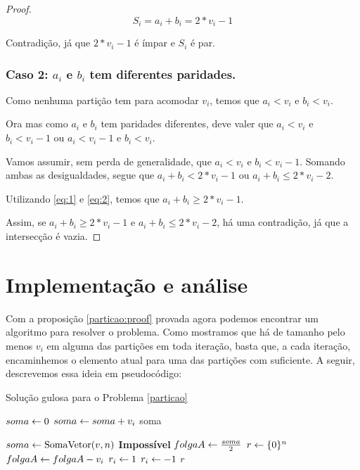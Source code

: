 \begin{proof}
$$S_i = a_i + b_i = 2*v_i - 1$$

Contradição, já que $2*v_i - 1$ é ímpar e $S_i$ é par.

\subsubsection*{Caso 2: $a_i$ e $b_i$ tem diferentes paridades.}

Como nenhuma partição tem  para acomodar $v_i$, temos que $a_i < v_i$ e $b_i < v_i$.

Ora mas como $a_i$ e $b_i$ tem paridades diferentes, deve valer que $a_i < v_i$ e $b_i < v_i - 1$ ou $a_i < v_i - 1$ e $b_i < v_i$.

Vamos assumir, sem perda de generalidade, que $a_i < v_i$ e $b_i < v_i - 1$. Somando ambas as desigualdades, segue que $a_i + b_i < 2*v_i - 1$ ou $a_i + b_i \leq 2*v_i - 2$.

Utilizando \ref{eq:1} e \ref{eq:2}, temos que $a_i + b_i \geq 2*v_i - 1$.

Assim, se $a_i + b_i \geq 2*v_i - 1$ e $a_i + b_i \leq 2*v_i - 2$, há uma contradição, já que a intersecção é vazia.

\end{proof}

\section{Implementação e análise}

Com a proposição \ref{particao:proof} provada agora podemos encontrar um algoritmo para resolver o problema. Como mostramos que há  de tamanho pelo menos $v_i$ em alguma das partições em toda iteração, basta que, a cada iteração, encaminhemos o elemento atual para uma das partições com  suficiente. A seguir, descrevemos essa ideia em pseudocódigo:

\begin{algorithm}[h]
\caption{Solução gulosa para o Problema \ref{particao}}
\label{particao:code}
\begin{algorithmic}[1]
    \State $soma \leftarrow 0$
        \State $soma \leftarrow soma + v_i$
    \EndFor
    \State \Return soma
\EndFunction

    \State $soma \leftarrow \text{SomaVetor}(v, n)$
        \State \Return \textbf{Impossível}
    \EndIf
    \State $folgaA \leftarrow \frac{soma}{2}$
    \State $r \leftarrow \{0\}^n$
            \State $folgaA \leftarrow folgaA - v_i$
            \State $r_i \leftarrow 1$
        \Else
            \State $r_i \leftarrow -1$
        \EndIf
    \EndFor
    \State \Return $r$
\EndFunction
\end{algorithmic}
\end{algorithm}


